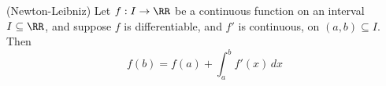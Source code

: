 

\begin{theorem}
(Newton-Leibniz) Let $f: I\to \RR $ be a continuous function on 
an interval $I\subseteq \RR$, and suppose $f$ is differentiable, 
and $f'$ is continuous, on $(a,b)\subseteq I$. Then
$$
f(b) = f(a) + \int_a^b f'(x)\,dx
$$
\end{theorem}

